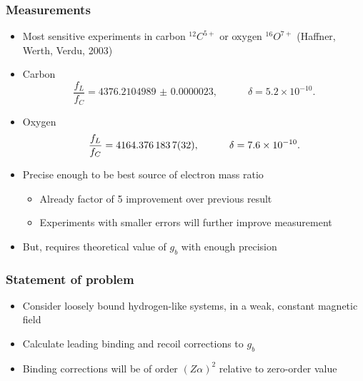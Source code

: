 \documentclass[11ppt]{beamer}
\newcommand{\beq}{\begin{equation*} }
\newcommand{\eeq}{\end{equation*} }
\begin{document}
\begin{frame}
\frametitle{Measurements}
	\begin{itemize}
	  \item Most sensitive experiments in carbon $^{12}C^{5+}$ or oxygen $^{16} O^{7+}$ (Haffner, Werth, Verdu, 2003)
	  \item Carbon
	  	\small \beq
			 \frac{f_L}{f_C} = \num{4376.2104989(23)},	\hspace{3em} 	\delta= 5.2 \times 10^{-10}.
		\eeq \normalsize
	  \item Oxygen
		\small \beq
				 \frac{f_L}{f_C} = \num{4 164.376 1837 (32)}, \hspace{3em} \delta= 7.6 \times 10^{-10}.
		\eeq \normalsize
		\item Precise enough to be best source of electron mass ratio
		\begin{itemize}
		  \item Already factor of 5 improvement over previous result
		  \item Experiments with smaller errors will further improve measurement
		\end{itemize}
		\item But, requires theoretical value of $g_b$ with enough precision
	\end{itemize}
\end{frame}



\begin{frame}
\frametitle{Statement of problem}
\begin{itemize}
  \item Consider loosely bound hydrogen-like systems, in a weak, constant magnetic field
  \item Calculate leading binding and recoil corrections to $g_b$
  \item Binding corrections will be of order $(Z\alpha)^2$ relative to zero-order value
\end{itemize}
\end{frame}
\end{document}
